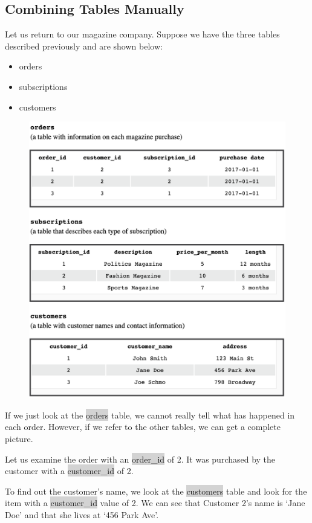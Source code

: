 \documentclass[11pt]{article}
\begin{document}
{{\subsection{Combining Tables Manually}
Let us return to our magazine company. Suppose we have the three tables described previously and are shown below:
\begin{itemize}[leftmargin = *]
\item orders
\item subscriptions
\item customers
\end{itemize}
\begin{figure}[H]
\includegraphics[scale = 0.73]{4_1}
\centering
\end{figure}
If we just look at the \colorbox{lightgray}{orders} table, we cannot really tell what has happened in each order. However, if we refer to the other tables, we can get a complete picture.

Let us examine the order with an \colorbox{lightgray}{order\_id} of 2. It was purchased by the customer with a \colorbox{lightgray}{customer\_id} of 2.

To find out the customer’s name, we look at the \colorbox{lightgray}{customers} table and look for the item with a \colorbox{lightgray}{customer\_id} value of 2. We can see that Customer 2’s name is ‘Jane Doe’ and that she lives at ‘456 Park Ave’.

}}
\end{document}
